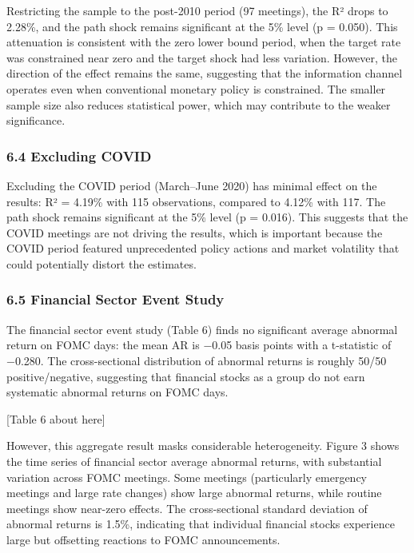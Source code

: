 \documentclass[
]{article}
\begin{document}
Restricting the sample to the post-2010 period (97 meetings), the R²
drops to 2.28\%, and the path shock remains significant at the 5\% level
(p = 0.050). This attenuation is consistent with the zero lower bound
period, when the target rate was constrained near zero and the target
shock had less variation. However, the direction of the effect remains
the same, suggesting that the information channel operates even when
conventional monetary policy is constrained. The smaller sample size
also reduces statistical power, which may contribute to the weaker
significance.

\subsubsection{6.4 Excluding COVID}\label{excluding-covid}

Excluding the COVID period (March--June 2020) has minimal effect on the
results: R² = 4.19\% with 115 observations, compared to 4.12\% with 117.
The path shock remains significant at the 5\% level (p = 0.016). This
suggests that the COVID meetings are not driving the results, which is
important because the COVID period featured unprecedented policy actions
and market volatility that could potentially distort the estimates.

\subsubsection{6.5 Financial Sector Event
Study}\label{financial-sector-event-study}

The financial sector event study (Table 6) finds no significant average
abnormal return on FOMC days: the mean AR is −0.05 basis points with a
t-statistic of −0.280. The cross-sectional distribution of abnormal
returns is roughly 50/50 positive/negative, suggesting that financial
stocks as a group do not earn systematic abnormal returns on FOMC days.

{[}Table 6 about here{]}

However, this aggregate result masks considerable heterogeneity. Figure
3 shows the time series of financial sector average abnormal returns,
with substantial variation across FOMC meetings. Some meetings
(particularly emergency meetings and large rate changes) show large
abnormal returns, while routine meetings show near-zero effects. The
cross-sectional standard deviation of abnormal returns is 1.5\%,
indicating that individual financial stocks experience large but
offsetting reactions to FOMC announcements.
\end{document}

